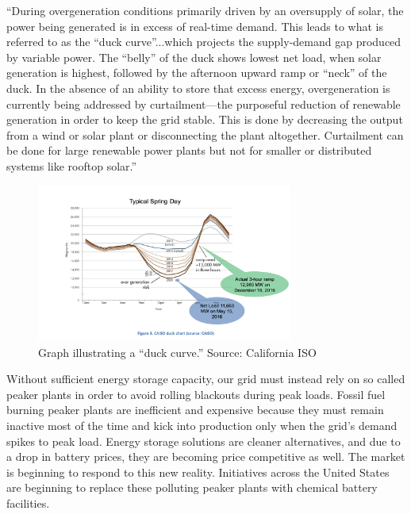 \documentclass[hidelinks,12pt,a4paper]{article}
\begin{document}
\begin{displayquote}
“During overgeneration conditions primarily driven by an oversupply of solar, the power being generated is in excess of real-time demand. This leads to what is referred to as the “duck curve”...which projects the supply-demand gap produced by variable power. The “belly” of the duck shows lowest net load, when solar generation is highest, followed by the afternoon upward ramp or “neck” of the duck. In the absence of an ability to store that excess energy, overgeneration is currently being addressed by curtailment—the purposeful reduction of renewable generation in order to keep the grid stable. This is done by decreasing the output from a wind or solar plant or disconnecting the plant altogether. Curtailment can be done for large renewable power plants but not for smaller or distributed systems like rooftop solar.” \cite{EnergyStorageCaliforniaClimateandEnergyGoals}
\end{displayquote}

\begin{figure}[ht!]
    \centering
    \includegraphics[width=0.75\textwidth]{california-duck-curve.png}
    \caption{Graph illustrating a “duck curve.” Source: California ISO \cite{UsingRenewablesToOperateLowCarbonGrid}}
\end{figure}
\FloatBarrier

Without sufficient energy storage capacity, our grid must instead rely on so called peaker plants in order to avoid rolling blackouts during peak loads. Fossil fuel burning peaker plants are inefficient and expensive because they must remain inactive most of the time and kick into production only when the grid's demand spikes to peak load. Energy storage solutions are cleaner alternatives, and due to a drop in battery prices, they are becoming price competitive as well. The market is beginning to respond to this new reality. Initiatives across the United States are beginning to replace these polluting peaker plants with chemical battery facilities. \cite{StorageWillReplaceThreeCaliforniaGasPlants, NewYorkMovesToPhaseOutOlderPeakingPlants}
\end{document}
